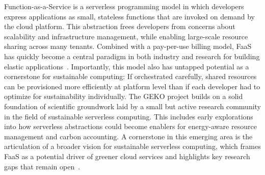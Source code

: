






Function-as-a-Service is a serverless programming model in which developers express applications as small, stateless functions that are invoked on demand by the cloud platform. 
This abstraction frees developers from concerns about scalability and infrastructure management, while enabling large-scale resource sharing across many tenants. 
Combined with a pay-per-use billing model, FaaS has quickly become a central paradigm in both industry and research for building elastic applications~\cite{jonas_cloud_2019}.
Importantly, this model also has untapped potential as a cornerstone for sustainable computing: If orchestrated carefully, shared resources can be provisioned more efficiently at platform level than if each developer had to optimize for sustainability individually.
The GEKO project builds on a solid foundation of scientific groundwork laid by a small but active research community in the field of sustainable serverless computing. 
This includes early explorations into how serverless abstractions could become enablers for energy-aware resource management and carbon accounting. 
A cornerstone in this emerging area is the articulation of a broader vision for sustainable serverless computing, which frames FaaS as a potential driver of greener cloud services and highlights key research gaps that remain open~\cite{sharma_challenges_2023}.

